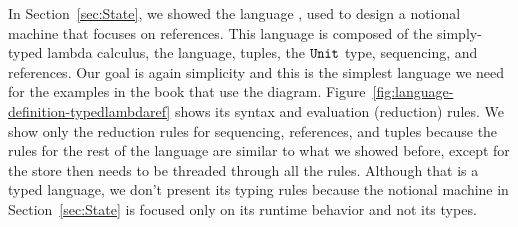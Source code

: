 
In Section~\ref{sec:State},
we showed the language ,
used
to design a notional machine that focuses on references.
This language is composed of
the simply-typed lambda calculus,
the  language,
tuples,
the $\texttt{Unit}$ type,
sequencing, and
references.
%
Our goal is again simplicity and
this is the simplest language we need for the examples in the book that use the diagram.
%
Figure~\ref{fig:language-definition-typedlambdaref} shows its syntax and evaluation (reduction) rules.
We show only
the reduction rules for
sequencing,
references, and
tuples
because
the rules for the rest of the language
are similar to what we showed before,
except for the store then needs to be threaded through all the rules.
%
Although that is a typed language,
we don't present its typing rules
because
the notional machine in Section~\ref{sec:State} is
focused only on its runtime behavior and not its types.


